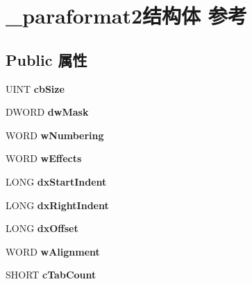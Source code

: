 \hypertarget{struct__paraformat2}{}\section{\+\_\+paraformat2结构体 参考}
\label{struct__paraformat2}
\subsection*{Public 属性}
\begin{DoxyCompactItemize}
\item 
\mbox{\label{struct__paraformat2_a97091c4e8a8058b6db0076009e13647b}} 
U\+I\+NT {\bfseries cb\+Size}
\item 
\mbox{\label{struct__paraformat2_a48cfc6532dd184e08c03b05e9ecb5a1f}} 
D\+W\+O\+RD {\bfseries dw\+Mask}
\item 
\mbox{\label{struct__paraformat2_ad71e0089d4c540bf1a50c0204a64ac0e}} 
W\+O\+RD {\bfseries w\+Numbering}
\item 
\mbox{\label{struct__paraformat2_aed6bfe500ce9bba19287ecfffce77f85}} 
W\+O\+RD {\bfseries w\+Effects}
\item 
\mbox{\label{struct__paraformat2_af13619f42e314dd769c84d910f45016d}} 
L\+O\+NG {\bfseries dx\+Start\+Indent}
\item 
\mbox{\label{struct__paraformat2_a486459934bcb9dbd2bfe94015f079bbe}} 
L\+O\+NG {\bfseries dx\+Right\+Indent}
\item 
\mbox{\label{struct__paraformat2_a8d774f8b3bb8d7d5d97e6d13ea4a32fe}} 
L\+O\+NG {\bfseries dx\+Offset}
\item 
\mbox{\label{struct__paraformat2_a262b6a0b41ccb96013e96eb5df4377f7}} 
W\+O\+RD {\bfseries w\+Alignment}
\item 
\mbox{\label{struct__paraformat2_add70ac86b45d70733ea53c61223990d6}} 
S\+H\+O\+RT {\bfseries c\+Tab\+Count}
\item 
\mbox{\label{struct__paraformat2_ace6d48e40d43339c37d9113aeb6e67d6}} 

\end{DoxyCompactItemize}

